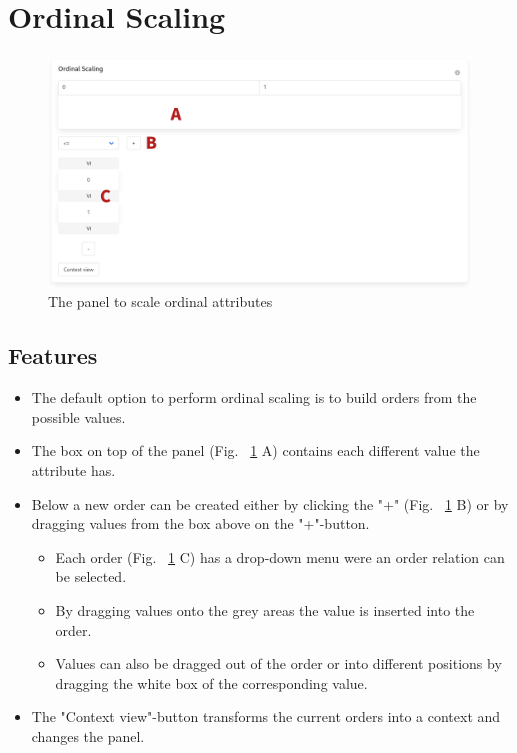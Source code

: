 \documentclass[]{report}
\begin{document}
\newpage
\section{Ordinal Scaling}
\begin{figure}[H]
	\includegraphics[width=\linewidth]{final_presentation/images/ordinal.png}
	\caption{The panel to scale ordinal attributes}
	\label{fig:p5}
\end{figure}
\subsection{Features}
\begin{itemize}
    \item The default option to perform ordinal scaling is to build orders from the possible values.
    \item The box on top of the panel (Fig. ~\ref{fig:p5} A) contains each different value the attribute has.
    \item Below a new order can be created either by clicking the "+" (Fig. ~\ref{fig:p5} B) or by dragging values from the box above on the "+"-button.
    \begin{itemize}
        \item Each order (Fig. ~\ref{fig:p5} C) has a drop-down menu were an order relation can be selected.
        \item By dragging values onto the grey areas the value is inserted into the order.
        \item Values can also be dragged out of the order or into different positions by dragging the white box of the corresponding value.
    \end{itemize}
    \item The "Context view"-button transforms the current orders into a context and changes the panel.
\end{itemize}
\end{document}
